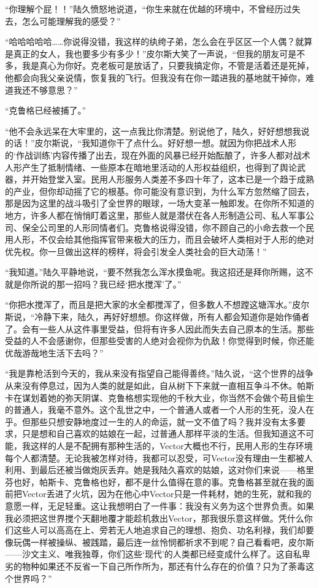 “你理解个屁！！”陆久愤怒地说道，“你生来就在优越的环境中，不曾经历过失去，怎么可能理解我的感受？”

“哈哈哈哈哈……你说得没错，我这样的纨绔子弟，怎么会在乎区区一个人偶？就算是真正的女人，我也要多少有多少！”皮尔斯大笑了一声说，“但我的朋友可是不多，我是真心为你好。克老板可是放话了，只要我搞定你，不管是活着还是死掉，他都会向我父亲说情，恢复我的飞行。但我没有在你一踏进我的基地就干掉你，难道我还不够意思？”

“克鲁格已经被捕了。”

“他不会永远呆在大牢里的，这一点我比你清楚。别说他了，陆久，好好想想我说的话！”皮尔斯说，“我知道你干了点什么。好好想一想。就因为你把战术人形的‘作战训练’内容传播了出去，现在外面的风暴已经开始酝酿了，许多人都对战术人形产生了抵制情绪、一些原本在暗地里活动的人形权益组织，也得到了舆论武器，并开始登堂入室。民用人形服务人类差不多四十年了，这本已是一个趋于成熟的产业，但你却动摇了它的根基。你可能没有意识到，为什么军方忽然缩了回去，那是因为这里的战斗吸引了全世界的眼球，一场大变革一触即发。在你所不知道的地方，许多人都在悄悄盯着这里，那些人就是潜伏在各人形制造公司、私人军事公司、保全公司里的人形同情者们。克鲁格说得没错，你不顾自己的小命去救一个民用人形，不仅会给其他指挥官带来极大的压力，而且会破坏人类相对于人形的绝对优先权。你一旦做出这样的榜样，将会引发全人类社会的巨大动荡！”

“我知道。”陆久平静地说，“要不然我怎么浑水摸鱼呢。我这招还是拜你所赐，这不就是你所说的那一招吗？我已经‘把水搅浑’了。”

“你把水搅浑了，而且是把大家的水全都搅浑了，但多数人不想蹚这塘浑水。”皮尔斯说，“冷静下来，陆久，再好好想想。你这样做，所有人都会知道你是始作俑者了。会有一些人从这件事里受益，但将有许多人因此而失去自己原本的生活。那些受益的人不会感谢你，但那些受害的人绝对会视你为仇敌！你觉得到时候，你还能优哉游哉地生活下去吗？”

“我是靠枪活到今天的，我从来没有指望自己能得善终。”陆久说，“这个世界的战争从来没有停息过，因为人类的就是如此，自从树下下来就一直相互争斗不休。帕斯卡在谋划着她的弥天阴谋、克鲁格想实现他的千秋大业，你当然不会做个苟且偷生的普通人，我毫不意外。这个乱世之中，一个普通人或者一个人形的生死，没人在乎。但那些只想安静地度过一生的人的命运，就一文不值了吗？我并没有太多要求，只是想和自己喜欢的姑娘在一起，过普通人那样平淡的生活。但我知道这不可能，我这样的人是不配拥有那种生活的，Vector大概也不行，民用人形的生存环境每个人都清楚。无论我被怎样对待，我都可以忍受，可Vector没有理由一生都被人利用、到最后还被当做炮灰丢弃。她是我陆久喜欢的姑娘，这对你们来说——格里芬也好，帕斯卡、克鲁格也好，都不是什么值得在意的事。克鲁格甚至就在我的面前把Vector丢进了火坑，因为在他心中Vector只是一件耗材，她的生死，就和我的意愿一样，无足轻重。这让我想明白了一件事：我没有义务为这个世界负责。如果我必须把这世界搅个天翻地覆才能趁机救出Vector，那我很乐意这样做。凭什么你们这些人可以高高在上、旁若无人地追求自己的理想、抱负、功名利禄，我们却要像玩偶一样被操纵、被践踏，最后连一丝怜悯都祈求不到呢？自己看看吧，皮尔斯——沙文主义、唯我独尊，你们这些‘现代’的人类都已经变成什么样了。这自私卑劣的物种如果还不反省一下自己所作所为，那还有什么存在的价值？只为了荼毒这个世界吗？”

